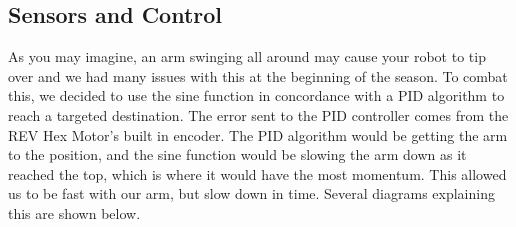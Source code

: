 \subsection*{Sensors and Control}
As you may imagine, an arm swinging all around may cause your robot to tip over and we had many issues with this at the beginning of the season. To combat this, we decided to use the sine function in concordance with a PID algorithm to reach a targeted destination. The error sent to the PID controller comes from the REV Hex Motor’s built in encoder. The PID algorithm would be getting the arm to the position, and the sine function would be slowing the arm down as it reached the top, which is where it would have the most momentum. This allowed us to be fast with our arm, but slow down in time. Several diagrams explaining this are shown below.







